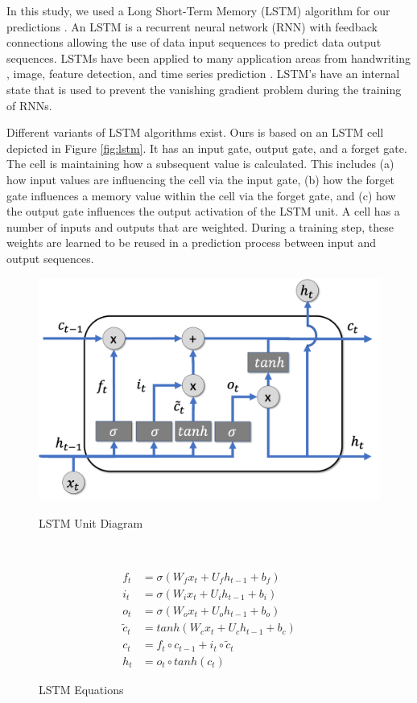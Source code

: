 \documentclass[12pt]{article}
\theoremstyle{definition}
\renewcommand{\_}{%
    \textunderscore\hspace{0pt}%
}
\begin{document}
In this study, we used a Long Short-Term Memory (LSTM) algorithm for our predictions \cite{www-keras-lstm,Hochreiter1997-dk}. An LSTM is a recurrent neural network (RNN) \cite{Rumelhart1986-li} with feedback connections allowing the use of data input sequences to predict data output sequences. LSTMs have been applied to many application areas from handwriting \cite{Graves2009-qb}, image, feature detection, and time series prediction \cite{Schmidhuber2005-oy}. LSTM's have an internal state that is used to prevent the vanishing gradient problem \cite{Hochreiter1991-mp} during the training of RNNs.

Different variants of LSTM algorithms exist. Ours is based on an LSTM cell depicted in Figure \ref{fig:lstm}. 
It has an input gate, output gate, and a forget gate. The cell is maintaining how a subsequent value is calculated. This includes (a) how input values are influencing the cell via the input gate, (b) how the forget gate influences a memory value within the cell via the forget gate, and (c) how the output gate influences the output activation of the LSTM unit. A cell has a number of inputs and outputs that are weighted. During a training step, these weights are learned to be reused in a prediction process between input and output sequences.

\begin{figure}[h!]
\begin{minipage}[b]{0.6\textwidth}
    \centering
    \includegraphics[width=0.6\columnwidth]{images/lstm.pdf}
    \caption{LSTM Unit Diagram}
    \label{fig:lstm}
\end{minipage}
\ \
\begin{minipage}[b]{0.3\textwidth}
\vspace{-3cm}
\begin{equation*}
\begin{split}
    f_t &= \sigma(W_f x_t + U_f h_{t-1} + b_f) \\
    i_t &= \sigma(W_i x_t + U_i h_{t-1} + b_i) \\
    o_t &= \sigma(W_o x_t + U_o h_{t-1} + b_o)\\
    \tilde{c}_t &= tanh(W_c x_t + U_c h_{t-1} + b_c)\\
    c_t &= f_t \circ c_{t-1} +i_t \circ \tilde{c}_t \\ 
    h_t &= o_t \circ tanh(c_t) 
    \label{eq:lstm_equations}
\end{split}
\end{equation*}
\caption{LSTM Equations}
\label{fig:eq}
\end{minipage}
\end{figure}
\end{document}

